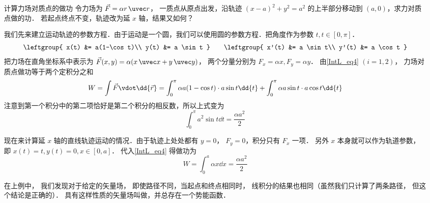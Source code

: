 \begin{exam}{计算力场对质点的做功}\label{IntL_ex1}
令力场为 $\vec F = \alpha r \,\uvec r$， 一质点从原点出发，沿轨迹 $(x-a)^2 + y^2 = a^2$ 的上半部分移动到 $(a,0)$，求力对质点做的功． 若起点终点不变，轨迹改为延 $x$ 轴，结果又如何？

我们先来建立运动轨迹的参数方程．由于运动是一个圆，我们可以使用圆的参数方程．把角度作为参数 $t, t\in [0,\pi]$．
\begin{equation}
\leftgroup{
x(t) &= a(1-\cos t)\\
y(t) &= a \sin t
}
\qquad 
\leftgroup{
x'(t) &= a \sin t\\
y'(t) &= a \cos t
}
\end{equation}
把力场在直角坐标系中表示为 $\vec F(x,y) = \alpha (x\,\uvec x + y\,\uvec y)$， 两个分量分别为 $F_x = \alpha x, F_y = \alpha y$． 由\autoref{IntL_eq4} $(i=1,2)$， 力场对质点做功等于两个定积分之和
\begin{equation}
W = \int \vec F \vdot \dd{\vec r} =\int_0^\pi \alpha a(1-\cos t) \cdot a \sin t \dd{t} + \int_0^\pi \alpha a \sin t \cdot a \cos t \dd{t}
\end{equation}
注意到第一个积分中的第二项恰好是第二个积分的相反数，所以上式变为
\begin{equation}
\int_0^\pi a^2 \sin t \dd{t} = \frac{\alpha a^2}{2}
\end{equation}

现在来计算延 $x$ 轴的直线轨迹运动的情况．由于轨迹上处处都有 $y=0$， $F_y = 0$，积分只有 $F_x$ 一项． 另外 $x$ 本身就可以作为轨道参数，即 $x(t) = t, y(t) = 0, x\in [0,a]$． 代入\autoref{IntL_eq4} 得做功为
\begin{equation}
W = \int_0^a \alpha x \dd{x} = \frac{\alpha a^2}{2}
\end{equation}
\end{exam}

在上例中， 我们发现对于给定的矢量场， 即使路径不同，当起点和终点相同时， 线积分的结果也相同（虽然我们只计算了两条路径， 但这个结论是正确的）． 具有这样性质的矢量场叫做，并总存在一个势能函数． 




